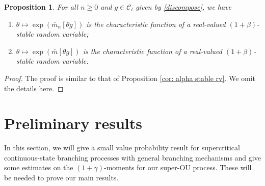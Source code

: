 \documentclass[12pt,a4paper]{amsart}
\theoremstyle{plain}
\newtheorem{prop}[thm]{Proposition}
\theoremstyle{definition}
\numberwithin{equation}{section}
\begin{document}
\begin{prop}
\label{cor: alpha stable rv 1}
For all $n\geq 0$ and $g\in \mathcal C_l$ given by \eqref{discompose}, we have
\begin{enumerate}
\item
\label{it: first stableb}
    $\theta \mapsto \exp(\bar{m}_n[\theta g])$ is the characteristic function of a real-valued $(1+\beta)$-stable random variable;
\item
\label{it: second stableb}
    $\theta \mapsto \exp(\bar m[\theta g])$ is the characteristic function of a real-valued $(1+\beta)$-stable random variable.
\end{enumerate}
\end{prop}
\begin{proof}
The proof is similar to that of Proposition \ref{cor: alpha stable rv}. We omit the details here.
\end{proof}

\section{Preliminary results}

In this section, we will give a small value probability result for supercritical continuous-state branching processes with general branching mechanisms and
give some estimates on the $(1+\gamma)$-moments for our super-OU process.
These will be needed to prove our main results.
\end{document}
